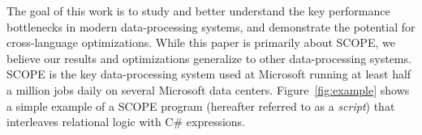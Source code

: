 The goal of this work is to study and better understand the key performance bottlenecks in modern data-processing systems, and demonstrate the potential for cross-language optimizations. While this paper is primarily about SCOPE, we believe our results and optimizations generalize to other data-processing systems. 
SCOPE is the key data-processing system used at Microsoft running at least half a million jobs daily on several Microsoft data centers. 
Figure~\ref{fig:example} shows a simple example of a SCOPE program (hereafter referred to as a {\em script}) that interleaves relational logic with C\# expressions.







